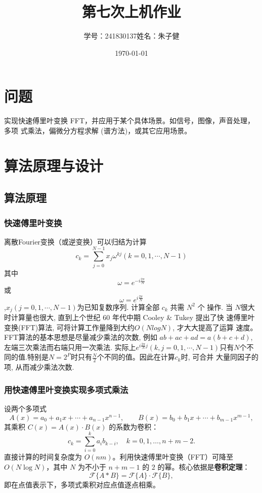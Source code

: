 \documentclass{article}
\title{第七次上机作业}
\author{学号：241830137\quad 姓名：朱子健}
\date{\today}
\begin{document}
\maketitle

\section{问题}
实现快速傅里叶变换 FFT，并应用于某个具体场景。如信号，图像，声音处理，多项
式乘法，偏微分方程求解 (谱方法)，或其它应用场景。

\section{算法原理与设计}
\subsection{算法原理}
\subsubsection{快速傅里叶变换}
离散Fourier变换（或逆变换）可以归结为计算
\[
c_{k} = \sum_{j=0}^{N-1}x_{j}\omega^{kj}    (k = 0, 1, \cdots,N-1)
\]
其中\[\omega = e^{-i\frac{2\pi}{N}}\]或\[\omega = e^{i\frac{2\pi}{N}}\],${x_{j}}(j = 0, 1, \cdots,N-1)$为已知复数序列. 计算全部 $c_{k}$ 共需 $N^{2}$ 个
操作. 当 $N $很大时计算量也很大, 直到上个世纪 60 年代中期 Cooley \& Tukey 提出了快
速傅里叶变换(FFT)算法, 可将计算工作量降到大约$O(NlogN)$, 才大大提高了运算
速度。
FFT算法的基本思想是尽量减少乘法的次数, 例如 $ab + ac + ad = a(b + c + d)$, 左端三次乘法而右端只用一次乘法. 实际上$e^{i\frac{2\pi}{N}j}(k, j = 0, 1, \cdots,N-1)$只有$N$个不同的值.特别是$N = 2^{P}$时只有$\frac{N}{2}$个不同的值。因此在计算$c_{k}$时, 可合并
大量同因子的项, 从而减少乘法次数.
\subsubsection{用快速傅里叶变换实现多项式乘法}
设两个多项式
\[
A(x)=a_0+a_1x+\cdots+a_{n-1}x^{n-1},\qquad 
B(x)=b_0+b_1x+\cdots+b_{m-1}x^{m-1},
\]
其乘积 \(C(x)=A(x)\cdot B(x)\) 的系数为卷积：
\[
c_k=\sum_{i=0}^{k}a_i b_{k-i},\quad k=0,1,\dots,n+m-2.
\]
直接计算的时间复杂度为 \(O(nm)\)。利用快速傅里叶变换（FFT）可降至 \(O(N\log N)\)，其中 \(N\) 为不小于 \(n+m-1\) 的 \(2\) 的幂。核心依据是\textbf{卷积定理}：
\[
\mathcal{F}\{A * B\} = \mathcal{F}\{A\} \cdot \mathcal{F}\{B\},
\]
即在点值表示下，多项式乘积对应点值逐点相乘。
\end{document}

